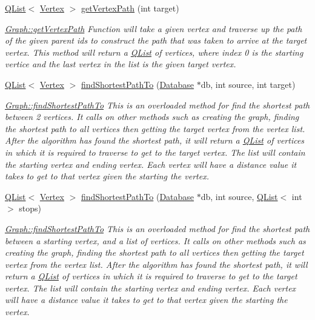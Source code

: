 \begin{DoxyCompactItemize}
\hyperlink{class_q_list}{Q\+List}$<$ \hyperlink{class_vertex}{Vertex} $>$ \hyperlink{class_graph_a0236e44d9f8e625d7dd370977e279e4d}{get\+Vertex\+Path} (int target)
\begin{DoxyCompactList}\small\item\em \hyperlink{class_graph_a09a9556b35c23b793429ba9433543a74}{Graph\+::get\+Vertex\+Path} Function will take a given vertex and traverse up the path of the given parent ids to construct the path that was taken to arrive at the target vertex. This method will return a \hyperlink{class_q_list}{Q\+List} of vertices, where index 0 is the starting vertice and the last vertex in the list is the given target vertex. \end{DoxyCompactList}\item 
\hyperlink{class_q_list}{Q\+List}$<$ \hyperlink{class_vertex}{Vertex} $>$ \hyperlink{class_graph_aa752bbc142469ed2f79c15121bfb61c7}{find\+Shortest\+Path\+To} (\hyperlink{class_database}{Database} $\ast$db, int source, int target)
\begin{DoxyCompactList}\small\item\em \hyperlink{class_graph_aa752bbc142469ed2f79c15121bfb61c7}{Graph\+::find\+Shortest\+Path\+To} This is an overloaded method for find the shortest path between 2 vertices. It calls on other methods such as creating the graph, finding the shortest path to all vertices then getting the target vertex from the vertex list. After the algorithm has found the shortest path, it will return a \hyperlink{class_q_list}{Q\+List} of vertices in which it is required to traverse to get to the target vertex. The list will contain the starting vertex and ending vertex. Each vertex will have a distance value it takes to get to that vertex given the starting the vertex. \end{DoxyCompactList}\item 
\hyperlink{class_q_list}{Q\+List}$<$ \hyperlink{class_vertex}{Vertex} $>$ \hyperlink{class_graph_a3f648a5d4a3ebd43dfde49545ea76d07}{find\+Shortest\+Path\+To} (\hyperlink{class_database}{Database} $\ast$db, int source, \hyperlink{class_q_list}{Q\+List}$<$ int $>$ stops)
\begin{DoxyCompactList}\small\item\em \hyperlink{class_graph_aa752bbc142469ed2f79c15121bfb61c7}{Graph\+::find\+Shortest\+Path\+To} This is an overloaded method for find the shortest path between a starting vertex, and a list of vertices. It calls on other methods such as creating the graph, finding the shortest path to all vertices then getting the target vertex from the vertex list. After the algorithm has found the shortest path, it will return a \hyperlink{class_q_list}{Q\+List} of vertices in which it is required to traverse to get to the target vertex. The list will contain the starting vertex and ending vertex. Each vertex will have a distance value it takes to get to that vertex given the starting the vertex. \end{DoxyCompactList}\item 

\end{DoxyCompactItemize}
